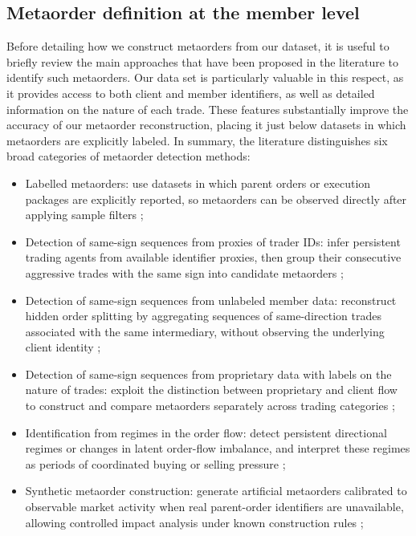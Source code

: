 \documentclass[11pt]{article}
\begin{document}
\subsection{Metaorder definition at the member level}
Before detailing how we construct metaorders from our dataset, it is useful to briefly review the main approaches that 
have been proposed in the literature to identify such metaorders. Our data set is particularly valuable in this respect, 
as it provides access to both client and member identifiers, as well as detailed information on the nature of each trade. 
These features substantially improve the accuracy of our metaorder reconstruction, placing it just below datasets in which 
metaorders are explicitly labeled. In summary, the literature distinguishes six broad 
categories of metaorder detection methods:

\begin{itemize}
    \item Labelled metaorders: use datasets in which parent orders or execution packages are explicitly reported, so metaorders can be observed directly after applying sample filters
    \cite{zarinelli,BucciEtAl2018,BucciEtAl2020Invariants};

    \item Detection of same-sign sequences from proxies of trader IDs: infer persistent trading agents from available identifier proxies, then group their consecutive aggressive trades with the same sign into candidate metaorders
    \cite{SatoKanazawa2024};

    \item Detection of same-sign sequences from unlabeled member data: reconstruct hidden order splitting by aggregating sequences of same-direction trades associated with the same intermediary, without observing the underlying client identity
    \cite{MoroEtAl2009,VaglicaEtAl2010};

    \item Detection of same-sign sequences from proprietary data with labels on the nature of trades: exploit the distinction between proprietary and client flow to construct and compare metaorders separately across trading categories
    \cite{GomesWaelbroeck2015};

    \item Identification from regimes in the order flow: detect persistent directional regimes or changes in latent order-flow imbalance, and interpret these regimes as periods of coordinated buying or selling pressure
    \cite{Tsaknaki2025};

    \item Synthetic metaorder construction: generate artificial metaorders calibrated to observable market activity when real parent-order identifiers are unavailable, allowing controlled impact analysis under known construction rules
    \cite{MaitrierEtAl2025};
    \end{itemize}
\end{document}
